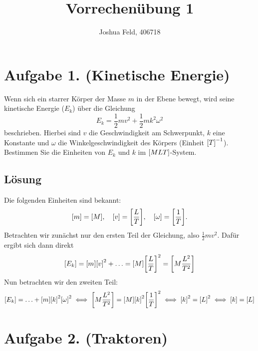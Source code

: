 \documentclass[german,12pt]{homework}
\title{Vorrechenübung 1}
\author{Joshua Feld, 406718}
\institute{RWTH Aachen University\\Lehrstuhl für computergestützte Analyse
technischer Systeme}
\DeclarePairedDelimiter{\benbrace}{[}{]}
\begin{document}
    \maketitle

    \section*{Aufgabe 1. (Kinetische Energie)}

    \begin{problem}
        Wenn sich ein starrer Körper der Masse \(m\) in der Ebene bewegt, wird seine kinetische Energie (\(E_k\)) über die Gleichung
        \[E_k = \frac{1}{2}mv^2 + \frac{1}{2}mk^2\omega^2\]
        beschrieben. Hierbei sind \(v\) die Geschwindigkeit am Schwerpunkt, \(k\) eine Konstante und \(\omega\) die Winkelgeschwindigkeit des Körpers (Einheit \(\benbrace*{T}^{-1}\)). Bestimmen Sie die Einheiten von \(E_k\) und \(k\) im \(\benbrace*{MLT}\)-System.
    \end{problem}

    \subsection*{Lösung} Die folgenden Einheiten sind bekannt:
    \[\benbrace*{m} = \benbrace*{M}, \quad \benbrace*{v} = \benbrace*{\frac{L}{T}}, \quad \benbrace*{\omega} = \benbrace*{\frac{1}{T}}.\]
    Betrachten wir zunächst nur den ersten Teil der Gleichung, also \(\frac{1}{2}mv^2\). Dafür ergibt sich dann direkt
    \[\benbrace*{E_k} = \benbrace*{m}\benbrace*{v}^2 + \ldots = \benbrace*{M}\benbrace*{\frac{L}{T}}^2 = \benbrace*{M\frac{L^2}{T^2}}\]
    Nun betrachten wir den zweiten Teil:
    \[\benbrace*{E_k} = \ldots + \benbrace*{m}\benbrace*{k}^2\benbrace*{\omega}^2 \iff \benbrace*{M\frac{L^2}{T^2}} = \benbrace*{M}\benbrace*{k}^2\benbrace*{\frac{1}{T}}^2 \iff \benbrace*{k}^2 = \benbrace*{L}^2 \iff \benbrace*{k} = \benbrace*{L}\]

    \section*{Aufgabe 2. (Traktoren)}
\end{document}
